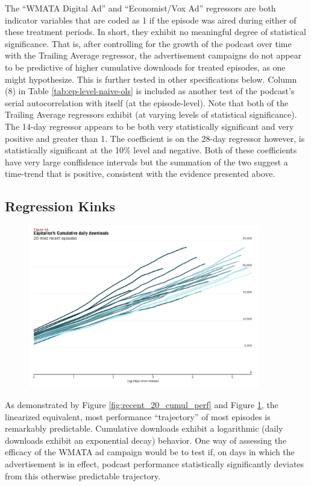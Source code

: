 \documentclass[11pt, letterpaper, twoside]{article}
\begin{document}
The ``WMATA Digital Ad'' and ``Economist/Vox Ad'' regressors are both indicator variables that are coded as 1 if the episode was aired during either of these treatment periods. In short, they exhibit no meaningful degree of statistical significance. That is, after controlling for the growth of the podcast over time with the Trailing Average regressor, the advertisement campaigns do not appear to be predictive of higher cumulative downloads for treated episodes, as one might hypothesize. This is further tested in other specifications below. Column (8) in Table \ref{tab:ep-level-naive-ols} is included as another test of the podcast's serial autocorrelation with itself (at the episode-level). Note that both of the Trailing Average regressors exhibit (at varying levels of statistical significance). The 14-day regressor appears to be both very statistically significant and very positive and greater than 1. The coefficient is on the 28-day regressor however, is statistically significant at the 10\% level and negative. Both of these coefficients have very large conffidence intervals but the summation of the two suggest a time-trend that is positive, consistent with the evidence presented above.

\subsection{Regression Kinks}
\begin{figure}[!htb]
  \centering
  \includegraphics[width=0.9\textwidth]{figures/recent_20_episodes_linear_cumul_perf.png}
  \caption{}
  \label{fig:recent_20_linear_cumul_perf}
\end{figure}

As demonstrated by Figure \ref{fig:recent_20_cumul_perf} and Figure \ref{fig:recent_20_linear_cumul_perf}, the linearized equivalent, most performance ``trajectory'' of most episodes is remarkably predictable. Cumulative downloads exhibit a logarithmic (daily downloads exhibit an exponential decay) behavior. One way of assessing the efficacy of the WMATA ad campaign would be to test if, on days in which the advertisement is in effect, podcast performance statistically significantly deviates from this otherwise predictable trajectory.\\
\end{document}
